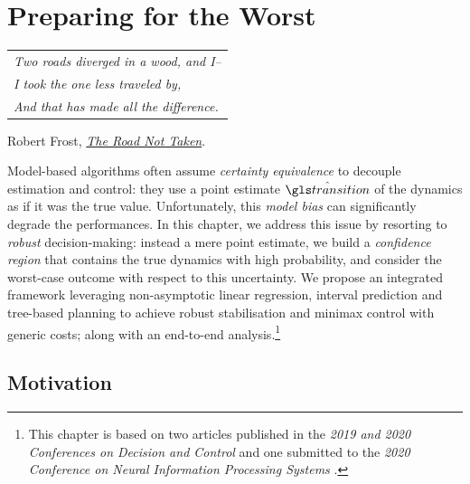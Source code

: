 
\graphicspath{{2-Chapters/7-Chapter/}}

\chapter{Preparing for the Worst}
\label{chapter:7}

\begin{flushright}
	\begin{tabular}{@{}l@{}}
		\emph{Two roads diverged in a wood, and I--}\\
		\emph{I took the one less traveled by,}\\
		\emph{And that has made all the difference.}\\
	\end{tabular}
	
	Robert Frost, \href{https://eleurent.github.io/sisyphe/texts/the-road-not-taken.html}{\emph{The Road Not Taken}}.
\end{flushright}

\abstractStartChapter{}%
Model-based algorithms often assume \emph{certainty equivalence} to decouple estimation and control: they use a point estimate $\hat{\Ps}$ of the dynamics as if it was the true value. Unfortunately, this \textit{model bias} can significantly degrade the performances. In this chapter, we address this issue by resorting to \emph{robust} decision-making: instead a mere point estimate, we build a \emph{confidence region} that contains the true dynamics with high probability, and consider the worst-case outcome with respect to this uncertainty. We propose an integrated framework leveraging non-asymptotic linear regression, interval prediction and tree-based planning to achieve robust stabilisation and minimax control with generic costs; along with an end-to-end analysis.\footnote{This chapter is based on two articles published in the \emph{2019 and 2020 Conferences on Decision and Control} \citep{Leurent2019interval,Leurent2020robust} and one submitted to the \emph{2020 Conference on Neural Information Processing Systems} \citep{Leurent2020beyond}.}
\minitocStartChapter{}

\section{Motivation}
\label{sec:robust-motivation}

